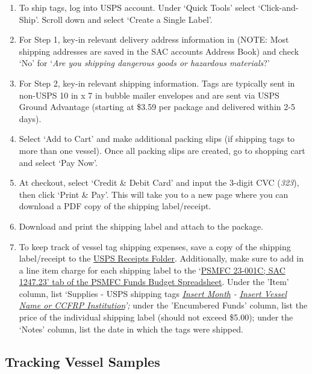 \documentclass[
  letterpaper,
  DIV=11,
  numbers=noendperiod]{scrartcl}
\begin{document}
\begin{enumerate}
\def\labelenumi{\arabic{enumi}.}
\item
  To ship tags, log into USPS account. Under `Quick Tools' select
  `Click-and-Ship'. Scroll down and select `Create a Single Label'.
\item
  For Step 1, key-in relevant delivery address information in (NOTE:
  Most shipping addresses are saved in the SAC accounts Address Book)
  and check `No' for `\emph{Are you shipping dangerous goods or
  hazardous materials}?'
\item
  For Step 2, key-in relevant shipping information. Tags are typically
  sent in non-USPS 10 in x 7 in bubble mailer envelopes and are sent via
  USPS Ground Advantage (starting at \$3.59 per package and delivered
  within 2-5 days).
\item
  Select `Add to Cart' and make additional packing slips (if shipping
  tags to more than one vessel). Once all packing slips are created, go
  to shopping cart and select `Pay Now'.
\item
  At checkout, select `Credit \& Debit Card' and input the 3-digit CVC
  (\emph{323}), then click `Print \& Pay'. This will take you to a new
  page where you can download a PDF copy of the shipping label/receipt.
\item
  Download and print the shipping label and attach to the package.
\item
  To keep track of vessel tag shipping expenses, save a copy of the
  shipping label/receipt to the
  \href{https://drive.google.com/drive/folders/1Au1fgI4Q4YLSMRgdUK6k4wnxC3-nAtSh?usp=drive_link}{USPS
  Receipts Folder}. Additionally, make sure to add in a line item charge
  for each shipping label to the
  `\href{https://docs.google.com/spreadsheets/d/1B21y44leBmms9Unx1HGpoDxx2XMXN5p7k_OTchB_RWg/edit?usp=sharing}{PSMFC
  23-001C; SAC 1247.23' tab of the PSMFC Funds Budget Spreadsheet}.
  Under the 'Item' column, list `Supplies - USPS shipping tags
  \ul{\emph{Insert Month}} \emph{- \ul{Insert Vessel Name or CCFRP
  Institution}';} under the 'Encumbered Funds' column, list the price of
  the individual shipping label (should not exceed \$5.00); under the
  `Notes' column, list the date in which the tags were shipped.
\end{enumerate}

\hypertarget{tracking-vessel-samples}{%
\subsection{Tracking Vessel Samples}\label{tracking-vessel-samples}}
\end{document}
